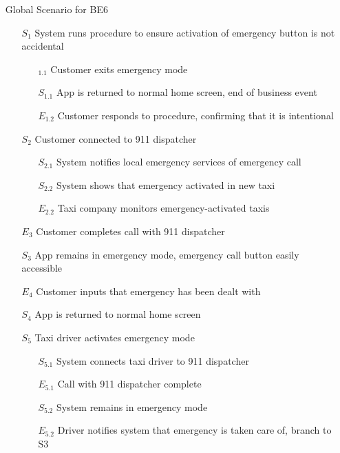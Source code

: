 \documentclass[]{article}
\begin{document}
\begin{enumerate}[{\textbf{BE}}1.]
\begin{enumerate}[{VP6}.1]
\begin{enumerate}
            \end{enumerate}
        \item[Global] Scenario for BE6
            \begin{enumerate}
                \item[$S_1$] System runs procedure to ensure activation of emergency button is not accidental
                \begin{enumerate}
                    \item[$_{1.1}$] Customer exits emergency mode
                    \item[$S_{1.1}$] App is returned to normal home screen, end of business event
                    \item[$E_{1.2}$] Customer responds to procedure, confirming that it is intentional
                \end{enumerate}
                \item[$S_2$] Customer connected to 911 dispatcher
                \begin{enumerate}
                    \item[$S_{2.1}$] System notifies local emergency services of emergency call
                    \item[$S_{2.2}$] System shows that emergency activated in new taxi
                    \item[$E_{2.2}$] Taxi company monitors emergency-activated taxis
                \end{enumerate}
                \item[$E_3$] Customer completes call with 911 dispatcher
                \item[$S_3$] App remains in emergency mode, emergency call button easily accessible
                \item[$E_4$] Customer inputs that emergency has been dealt with
                \item[$S_4$] App is returned to normal home screen
                \item[$S_5$] Taxi driver activates emergency mode
                \begin{enumerate}
                    \item[$S_{5.1}$] System connects taxi driver to 911 dispatcher
                    \item[$E_{5.1}$] Call with 911 dispatcher complete
                    \item[$S_{5.2}$] System remains in emergency mode
                    \item[$E_{5.2}$] Driver notifies system that emergency is taken care of, branch to S3

\end{enumerate}
\end{enumerate}
\end{enumerate}
\end{enumerate}
\end{document}
